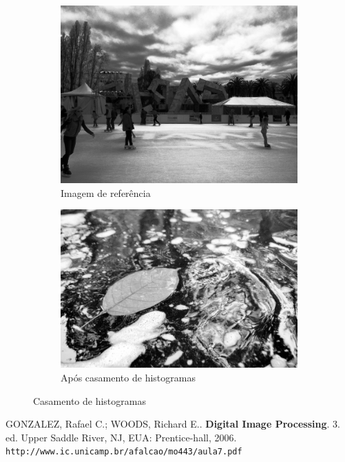 \documentclass[10pt,a4paper]{article}
\begin{document}
\begin{figure}[!ht]
    \centering
    \begin{subfigure}[ht]{0.45\textwidth}
        \includegraphics[width=\textwidth]{src.jpg}
        \caption{Imagem de referência}
        \label{fig:src}
    \end{subfigure}
    \qquad
    \begin{subfigure}[ht]{0.45\textwidth}
        \includegraphics[width=\textwidth]{dst.jpg}
        \caption{Após casamento de histogramas}
        \label{fig:dst}
    \end{subfigure}
    \caption{Casamento de histogramas}
    \label{fig:cas_hist}
\end{figure}

\begin{thebibliography}{99}
     GONZALEZ, Rafael C.; WOODS, Richard E.. \textbf{Digital Image Processing}. 3. ed. Upper Saddle River, NJ, EUA: Prentice-hall, 2006.
 \texttt{http://www.ic.unicamp.br/afalcao/mo443/aula7.pdf}
\end{thebibliography}
\end{document}
